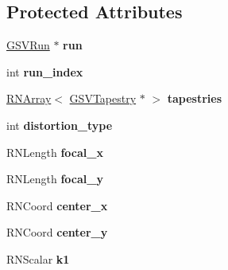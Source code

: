 \subsection*{Protected Attributes}
\begin{DoxyCompactItemize}
\item 
\hyperlink{class_g_s_v_run}{G\+S\+V\+Run} $\ast$ {\bfseries run}\hypertarget{class_g_s_v_camera_a2f744822272cc1807884aa69a38a3d0f}{}\label{class_g_s_v_camera_a2f744822272cc1807884aa69a38a3d0f}

\item 
int {\bfseries run\+\_\+index}\hypertarget{class_g_s_v_camera_abc0b2de1b14dda83dea5bc452fadae95}{}\label{class_g_s_v_camera_abc0b2de1b14dda83dea5bc452fadae95}

\item 
\hyperlink{class_r_n_array}{R\+N\+Array}$<$ \hyperlink{class_g_s_v_tapestry}{G\+S\+V\+Tapestry} $\ast$ $>$ {\bfseries tapestries}\hypertarget{class_g_s_v_camera_adf4ee18043d911f90e019154c310f17c}{}\label{class_g_s_v_camera_adf4ee18043d911f90e019154c310f17c}

\item 
int {\bfseries distortion\+\_\+type}\hypertarget{class_g_s_v_camera_a738977425f7851d725adcfabfb161584}{}\label{class_g_s_v_camera_a738977425f7851d725adcfabfb161584}

\item 
R\+N\+Length {\bfseries focal\+\_\+x}\hypertarget{class_g_s_v_camera_a949286be8b5d23e32aae069b2f6f1ce9}{}\label{class_g_s_v_camera_a949286be8b5d23e32aae069b2f6f1ce9}

\item 
R\+N\+Length {\bfseries focal\+\_\+y}\hypertarget{class_g_s_v_camera_acd27ab71a23676ef5272874fa1563b3d}{}\label{class_g_s_v_camera_acd27ab71a23676ef5272874fa1563b3d}

\item 
R\+N\+Coord {\bfseries center\+\_\+x}\hypertarget{class_g_s_v_camera_a1ce40357e741e5cae1563b9e53b61d07}{}\label{class_g_s_v_camera_a1ce40357e741e5cae1563b9e53b61d07}

\item 
R\+N\+Coord {\bfseries center\+\_\+y}\hypertarget{class_g_s_v_camera_acd079d80c8549dbe85978ade16391399}{}\label{class_g_s_v_camera_acd079d80c8549dbe85978ade16391399}

\item 
R\+N\+Scalar {\bfseries k1}\hypertarget{class_g_s_v_camera_a8cc6fe8c8f229ec5afe252c892f4370f}{}\label{class_g_s_v_camera_a8cc6fe8c8f229ec5afe252c892f4370f}


\end{DoxyCompactItemize}
